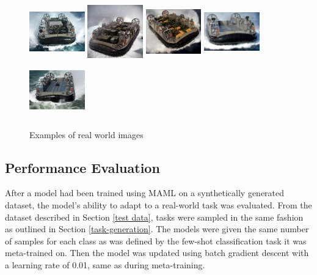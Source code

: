 \begin{figure}[H]
\subcaptionbox{}
  {\includegraphics[height=2.4cm, width=2.4cm]{images/real-images/water/1.jpg}}
\subcaptionbox{}%
  {\includegraphics[height=2.4cm, width=2.4cm]{images/real-images/water/2.jpg}}
\subcaptionbox{}%
  {\includegraphics[height=2.4cm, width=2.4cm]{images/real-images/water/3.jpg}}
\subcaptionbox{}
  {\includegraphics[height=2.4cm, width=2.4cm]{images/real-images/water/4.jpg}}
\subcaptionbox{}%
  {\includegraphics[height=2.4cm, width=2.4cm]{images/real-images/water/5.jpg}}
\caption{Examples of real world images}
\label{real-images}
\end{figure}


\subsection{Performance Evaluation}
After a model had been trained using \gls{MAML} on a synthetically generated dataset, the model's ability to adapt to a real-world task was evaluated. From the dataset described in Section \ref{test data}, tasks were sampled in the same fashion as outlined in Section \ref{task-generation}. The models were given the same number of samples for each class as was defined by the few-shot classification task it was meta-trained on. Then the model was updated using batch gradient descent with a learning rate of 0.01, same as during meta-training. 

